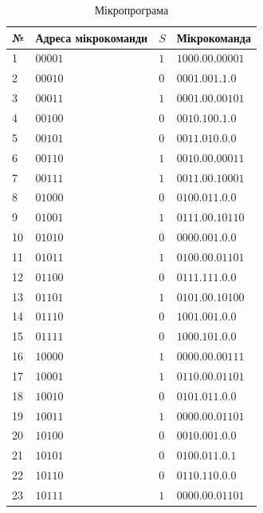 \documentclass[a4paper,oneside,DIV=12,12pt,headings=normal]{scrartcl}
\begin{document}
			\begin{table}[!htbp]
			\centering
				\begin{tabular}{llll}
					\toprule
						№ & Адреса мікрокоманди & $S$ & Мікрокоманда \\
					\midrule
						 1 & $00001$ & $1$ & $1000.00.00001$\\
						 2 & $00010$ & $0$ & $0001.001.1.0$\\
						 3 & $00011$ & $1$ & $0001.00.00101$\\
						 4 & $00100$ & $0$ & $0010.100.1.0$\\
						 5 & $00101$ & $0$ & $0011.010.0.0$\\
						 6 & $00110$ & $1$ & $0010.00.00011$\\
						 7 & $00111$ & $1$ & $0011.00.10001$\\
						 8 & $01000$ & $0$ & $0100.011.0.0$\\
						 9 & $01001$ & $1$ & $0111.00.10110$\\
						10 & $01010$ & $0$ & $0000.001.0.0$\\
						11 & $01011$ & $1$ & $0100.00.01101$\\
						12 & $01100$ & $0$ & $0111.111.0.0$\\
						13 & $01101$ & $1$ & $0101.00.10100$\\
						14 & $01110$ & $0$ & $1001.001.0.0$\\
						15 & $01111$ & $0$ & $1000.101.0.0$\\
						16 & $10000$ & $1$ & $0000.00.00111$\\
						17 & $10001$ & $1$ & $0110.00.01101$\\
						18 & $10010$ & $0$ & $0101.011.0.0$\\
						19 & $10011$ & $1$ & $0000.00.01101$\\
						20 & $10100$ & $0$ & $0010.001.0.0$\\
						21 & $10101$ & $0$ & $0100.011.0.1$\\
						22 & $10110$ & $0$ & $0110.110.0.0$\\
						23 & $10111$ & $1$ & $0000.00.01101$\\
					\bottomrule
				\end{tabular}
			\caption{Мікропрограма}
			\label{tab:microprogram}
			\end{table}
			
\end{document}
